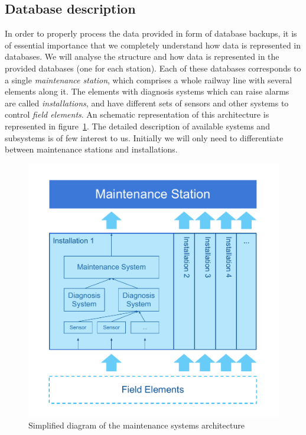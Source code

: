 \subsection{Database description}
\label{sec:database_description}
In order to properly process the data provided in form of database backups, it is of essential importance that we completely understand how data is represented in databases. We will analyse the structure and how data is represented in the provided databases (one for each station). Each of these databases corresponds to a single \emph{maintenance station}, which comprises a whole railway line with several elements along it. The elements with diagnosis systems which can raise alarms are called \emph{installations}, and have different sets of sensors and other systems to control \emph{field elements}. An schematic representation of this architecture is represented in figure~\ref{fig:arch_stations}. The detailed description of available systems and subsystems is of few interest to us. Initially we will only need to differentiate between maintenance stations and installations.

\begin{figure}[hbt]
\includegraphics[width=\textwidth]{./img/arch_stations.pdf}
\caption{Simplified diagram of the maintenance systems architecture} \label{fig:arch_stations}
\end{figure}

